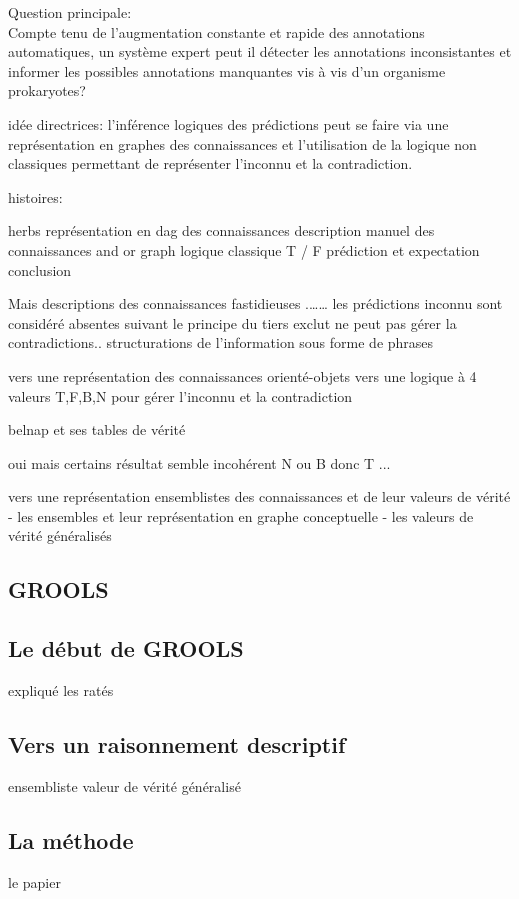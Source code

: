 Question principale:\\
Compte tenu de l'augmentation constante et rapide des annotations automatiques, un système expert peut il détecter les annotations inconsistantes et informer les possibles annotations manquantes vis à vis d'un organisme prokaryotes? 

idée directrices:
l'inférence logiques des prédictions peut se faire via une représentation en graphes des connaissances et l'utilisation de la logique non classiques permettant de représenter l'inconnu et la contradiction.

histoires:

herbs
   représentation en dag des connaissances
   description manuel des connaissances
   and or graph 
   logique classique T / F
   prédiction et expectation
   conclusion
   
Mais descriptions des connaissances fastidieuses .…… 
les prédictions inconnu sont considéré absentes suivant le principe du tiers exclut
ne peut pas gérer la contradictions..
structurations de l'information sous forme de phrases

vers une représentation des connaissances orienté-objets
vers une logique à 4 valeurs T,F,B,N pour gérer l'inconnu et la contradiction

belnap et ses tables de vérité

oui mais certains résultat semble incohérent  N ou B donc T ...

vers une représentation ensemblistes des connaissances et de leur valeurs de vérité
  - les ensembles et leur représentation en graphe conceptuelle
  - les valeurs de vérité généralisés

\begin{refsegment}
\chapter{GROOLS}
\section{Le début de GROOLS}
expliqué les ratés
\section{Vers un raisonnement descriptif}
ensembliste valeur de vérité généralisé
\section{La méthode}
le papier
\subbibliography
\end{refsegment}